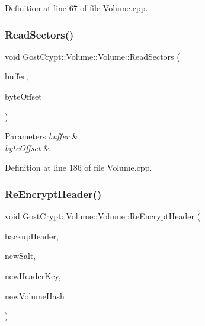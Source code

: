 Definition at line 67 of file Volume.\+cpp.

\mbox{\label{class_gost_crypt_1_1_volume_1_1_volume_a3fa2268b80039d55b3402e55bfe52a8d}} 
\subsubsection{\texorpdfstring{Read\+Sectors()}{ReadSectors()}}
{\footnotesize\ttfamily void Gost\+Crypt\+::\+Volume\+::\+Volume\+::\+Read\+Sectors (\begin{DoxyParamCaption}\item[{\hyperlink{class_gost_crypt_1_1_buffer_ptr}{Buffer\+Ptr} \&}]{buffer,  }\item[{quint64}]{byte\+Offset }\end{DoxyParamCaption})}


\begin{DoxyParams}{Parameters}
{\em buffer} & \\
\hline
{\em byte\+Offset} & \\
\hline
\end{DoxyParams}


Definition at line 186 of file Volume.\+cpp.

\mbox{\label{class_gost_crypt_1_1_volume_1_1_volume_a0025ff1fb7ab43176b5266ea6fdfbcf0}} 
\subsubsection{\texorpdfstring{Re\+Encrypt\+Header()}{ReEncryptHeader()}}
{\footnotesize\ttfamily void Gost\+Crypt\+::\+Volume\+::\+Volume\+::\+Re\+Encrypt\+Header (\begin{DoxyParamCaption}\item[{bool}]{backup\+Header,  }\item[{const \hyperlink{class_gost_crypt_1_1_buffer_ptr}{Buffer\+Ptr} \&}]{new\+Salt,  }\item[{const \hyperlink{class_gost_crypt_1_1_buffer_ptr}{Buffer\+Ptr} \&}]{new\+Header\+Key,  }\item[{Q\+Shared\+Pointer$<$ \hyperlink{class_gost_crypt_1_1_volume_1_1_volume_hash}{Volume\+Hash} $>$}]{new\+Volume\+Hash }\end{DoxyParamCaption})}



